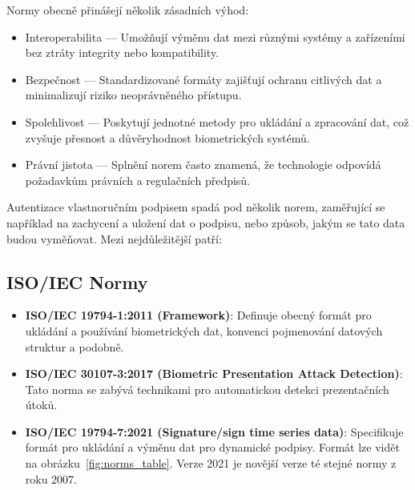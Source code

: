\noindent
Normy obecně přinášejí několik zásadních výhod:
\begin{itemize}
  \item Interoperabilita --- Umožňují výměnu dat mezi různými systémy a zařízeními bez ztráty integrity nebo kompatibility.
  \item Bezpečnost --- Standardizované formáty zajišťují ochranu citlivých dat a minimalizují riziko neoprávněného přístupu.
  \item Spolehlivost --- Poskytují jednotné metody pro ukládání a zpracování dat, což zvyšuje přesnost a důvěryhodnost biometrických systémů.
  \item Právní jistota --- Splnění norem často znamená, že technologie odpovídá požadavkům právních a regulačních předpisů.
\end{itemize}

Autentizace vlastnoručním podpisem spadá pod několik norem, zaměřující se například na zachycení a uložení dat o podpisu, nebo způsob, jakým se tato data budou vyměňovat. 
Mezi nejdůležitější patří:

\subsection*{ISO/IEC Normy}
\begin{itemize}
  \item \textbf{ISO/IEC 19794-1:2011 (Framework)}: 
  Definuje obecný formát pro ukládání a používání biometrických dat, konvenci pojmenování datových struktur a podobně.\cite{iso19794-1_2011} %

  \item \textbf{ISO/IEC 30107-3:2017 (Biometric Presentation Attack Detection)}: 
  Tato norma se zabývá technikami pro automatickou detekci prezentačních útoků.~\cite{ISO/IEC30107-3_2017} %

  \item \textbf{ISO/IEC 19794-7:2021 (Signature/sign time series data)}:
  Specifikuje formát pro ukládání a výměnu dat pro dynamické podpisy. 
  Formát lze vidět na obrázku~\ref{fig:norms_table}. 
  Verze 2021 je novější verze té stejné normy z roku 2007.~\cite{ISOIEC19794-7_2021} %
\end{itemize}

